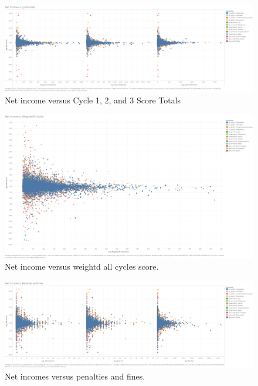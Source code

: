\documentclass{article}
\theoremstyle{mytheoremstyle}
\theoremstyle{mytheoremstyle}
\theoremstyle{myproblemstyle}
\begin{document}
\begin{figure}[htbp]
\centering
\includegraphics[width=\linewidth]{Images/Net Income vs. Cycle Totals.png}
\caption{Net income versus Cycle 1, 2, and 3 Score Totals}
\label{fig:net income vs cycle totals}
\end{figure}

\begin{figure}[htbp]
\centering
\includegraphics[width=\linewidth]{Images/Net Income vs. Weighted All Cycles.png}
\caption{Net income versus weightd all cycles score.}
\label{fig:net income vs. cycle weighted}
\end{figure}

\begin{figure}[htbp]
\centering
\includegraphics[width=\linewidth]{Images/Net Income vs. Penalties and Fines.png}
\caption{Net incomes versus penalties and fines.}
\label{fig:net income vs penalties and fines}
\end{figure}
\end{document}
